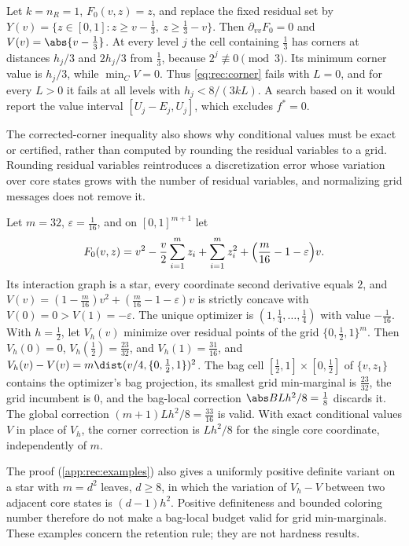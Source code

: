 \begin{example}\label{ex:rec:feasibility}
Let $k=n_R=1$, $F_0(v,z)=z$, and replace the fixed residual set by
$Y(v)=\{z\in[0,1]:z\ge v-\frac13,\ z\ge\frac13-v\}$. Then $\partial_{vv}F_0=0$
and $V(v)=\abs{v-\frac13}$. At every level $j$ the cell containing $\frac13$
has corners at distances $h_j/3$ and $2h_j/3$ from $\frac13$, because
$2^j\not\equiv0\pmod3$. Its minimum corner value is $h_j/3$, while
$\min_CV=0$. Thus \eqref{eq:rec:corner} fails with $L=0$, and for every
$L>0$ it fails at all levels with $h_j<8/(3kL)$. A search based on it would
report the value interval $[U_j-E_j,U_j]$, which excludes $f^*=0$.
\end{example}

The corrected-corner inequality also shows why conditional values must be
exact or certified, rather than computed by rounding the residual variables
to a grid. Rounding residual variables reintroduces a discretization error
whose variation over core states grows with the number of residual
variables, and normalizing grid messages does not remove it.

\begin{example}\label{ex:rec:star}
Let $m=32$, $\varepsilon=\frac1{16}$, and on $[0,1]^{m+1}$ let
\[
 F_0(v,z)=v^2-\frac v2\sum_{i=1}^mz_i+\sum_{i=1}^mz_i^2
 +\Bigl(\frac m{16}-1-\varepsilon\Bigr)v .
\]
Its interaction graph is a star, every coordinate second derivative equals
$2$, and $V(v)=(1-\frac m{16})v^2+(\frac m{16}-1-\varepsilon)v$ is strictly
concave with $V(0)=0>V(1)=-\varepsilon$. The unique optimizer is
$(1,\frac14,\ldots,\frac14)$ with value $-\frac1{16}$. With $h=\frac12$, let
$V_h(v)$ minimize over residual points of the grid $\{0,\frac12,1\}^m$. Then
$V_h(0)=0$, $V_h(\frac12)=\frac{23}{32}$, and $V_h(1)=\frac{31}{16}$, and
$V_h(v)-V(v)=m\dist(v/4,\{0,\frac12,1\})^2$. The bag cell
$[\frac12,1]\times[0,\frac12]$ of $\{v,z_1\}$ contains the optimizer's bag
projection, its smallest grid min-marginal is $\frac{23}{32}$, the grid
incumbent is $0$, and the bag-local correction $\abs BLh^2/8=\frac18$
discards it. The global correction $(m+1)Lh^2/8=\frac{33}{16}$ is valid. With
exact conditional values $V$ in place of $V_h$, the corner correction is
$Lh^2/8$ for the single core coordinate, independently of $m$.
\end{example}

The proof (\cref{app:rec:examples}) also gives a uniformly positive definite
variant on a star with $m=d^2$ leaves, $d\ge8$, in which the variation of
$V_h-V$ between two adjacent core states is $(d-1)h^2$. Positive
definiteness and bounded coloring number therefore do not make a bag-local
budget valid for grid min-marginals. These examples concern the retention
rule; they are not hardness results.

